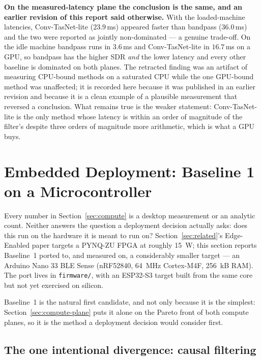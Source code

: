 \documentclass[11pt]{article}
\begin{document}
\textbf{On the measured-latency plane the conclusion is the same, and
an earlier revision of this report said otherwise.} With the loaded-machine
latencies, Conv-TasNet-lite ($23.9$\,ms) appeared faster than bandpass
($36.0$\,ms) and the two were reported as jointly non-dominated --- a
genuine trade-off. On the idle machine bandpass runs in $3.6$\,ms and
Conv-TasNet-lite in $16.7$\,ms on a GPU, so bandpass has the higher SDR
\emph{and} the lower latency and every other baseline is dominated on
both planes. The retracted finding was an artifact of measuring
CPU-bound methods on a saturated CPU while the one GPU-bound method was
unaffected; it is recorded here because it was published in an earlier
revision and because it is a clean example of a plausible measurement
that reversed a conclusion. What remains true is the weaker statement:
Conv-TasNet-lite is the only method whose latency is within an order of
magnitude of the filter's despite three orders of magnitude more
arithmetic, which is what a GPU buys.

\section{Embedded Deployment: Baseline 1 on a Microcontroller}
\label{sec:firmware}

Every number in Section~\ref{sec:compute} is a desktop measurement or an
analytic count. Neither answers the question a deployment decision actually
asks: does this run on the hardware it is meant to run on? Section~\ref{sec:related}'s
Edge-Enabled paper \cite{edgelung} targets a PYNQ-ZU FPGA at roughly 15~W;
this section reports Baseline~1 ported to, and measured on, a considerably
smaller target --- an Arduino Nano 33 BLE Sense (nRF52840, 64~MHz Cortex-M4F,
256~kB RAM). The port lives in \texttt{firmware/}, with an ESP32-S3 target
built from the same core but not yet exercised on silicon.

Baseline~1 is the natural first candidate, and not only because it is the
simplest: Section~\ref{sec:compute-plane} puts it alone on the Pareto front
of both compute planes, so it is the method a deployment decision would
consider first.

\subsection{The one intentional divergence: causal filtering}
\label{sec:firmware-causal}
\end{document}
